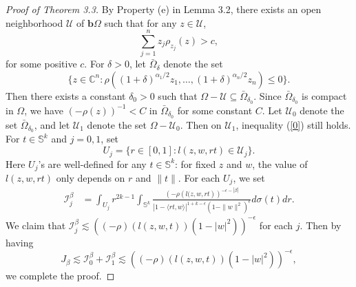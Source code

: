 \documentclass[reqno,12pt]{amsart}
\numberwithin{equation}{section}
\begin{document}
\begin{proof}[Proof of Theorem 3.3]
			By Property (e) in Lemma 3.2,  there exists an open neighborhood $\mathcal U$ of $\mathbf b\Omega$ such that for any $z\in \mathcal U$,\begin{equation}\label{0} \sum_{j=1}^{n}z_j\rho_{z_j}(z)>c,\end{equation} for some positive $c$. 
			For $\delta>0$, let $\bar\Omega_{\delta}$ denote the set
			\begin{equation}\label{***}\{z\in \mathbb C^n:\rho((1+\delta)^{\alpha_1/2}z_1,\dots,(1+\delta)^{\alpha_n/2}z_n)\leq0\}.
			\end{equation}
			Then there exists a constant $\delta_0>0$ such that $\Omega-\mathcal U\subseteq \bar \Omega_{\delta_0}$.
			Since $\bar\Omega_{\delta_0}$ is compact in $\Omega$,  we have $(-\rho(z))^{-1}<C$ in $\bar\Omega_{\delta_0}$ for some constant $C$. Let $\mathcal U_0$ denote the set $\bar{\Omega}_{\delta_0}$, and let $\mathcal U_1$ denote the set $\Omega-\mathcal U_0$. Then on $\mathcal U_1$, inequality (\ref{0}) still holds. For $t\in\mathbb S^k$ and $j=0,1$, set $$U_j=\{r\in [0,1]:l(z,w,rt)\in\mathcal U_j\}.$$
			Here $U_j$'s are well-defined for any $t\in \mathbb S^k$: for fixed $z$ and $w$, the value of $l(z,w,rt)$ only depends on $r$ and $\|t\|$.
			For each $U_j$, we set 
			\begin{align}\label{250}
			\mathcal  I^{\beta}_j&=\int_{U_j}r^{2k-1}\int_{\mathbb S^k}\frac{\left(-\rho\left(l(z,w,r t\right)\right)^{-\epsilon-|\beta|}}{|1-\langle rt,w\rangle|^{1+k-\epsilon}(1-\|w\|^2)^{\epsilon}}d\sigma (t)dr.
			\end{align} 
		{We claim that $\mathcal  I^{\beta}_j\lesssim \left((-\rho)(l(z,w,t))(1-|w|^2)\right)^{-\epsilon}$ for each $j$. Then by having
			\begin{equation}
		J_\beta\lesssim \mathcal I^{\beta}_0+\mathcal I^{\beta}_1\lesssim \left((-\rho)(l(z,w,t))(1-|w|^2)\right)^{-\epsilon},
		\end{equation} 
		we complete the proof.}
			

\end{proof}
\end{document}
